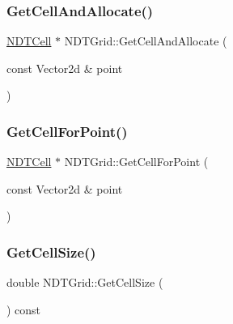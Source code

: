 \mbox{\label{classNDTGrid_aa0343aa6882ed7764815fbd853fc8569}} 
\subsubsection{\texorpdfstring{Get\+Cell\+And\+Allocate()}{GetCellAndAllocate()}}
{\footnotesize\ttfamily \hyperlink{classNDTCell}{N\+D\+T\+Cell} $\ast$ N\+D\+T\+Grid\+::\+Get\+Cell\+And\+Allocate (\begin{DoxyParamCaption}\item[{const Vector2d \&}]{point }\end{DoxyParamCaption})}

\mbox{\label{classNDTGrid_a9f11cfc35c17ac988917c99fad42bb22}} 
\subsubsection{\texorpdfstring{Get\+Cell\+For\+Point()}{GetCellForPoint()}}
{\footnotesize\ttfamily \hyperlink{classNDTCell}{N\+D\+T\+Cell} $\ast$ N\+D\+T\+Grid\+::\+Get\+Cell\+For\+Point (\begin{DoxyParamCaption}\item[{const Vector2d \&}]{point }\end{DoxyParamCaption})}

\mbox{\label{classNDTGrid_ad79296564d68f52f63b103af2145308b}} 
\subsubsection{\texorpdfstring{Get\+Cell\+Size()}{GetCellSize()}}
{\footnotesize\ttfamily double N\+D\+T\+Grid\+::\+Get\+Cell\+Size (\begin{DoxyParamCaption}{ }\end{DoxyParamCaption}) const\hspace{0.3cm}{\ttfamily [inline]}}

